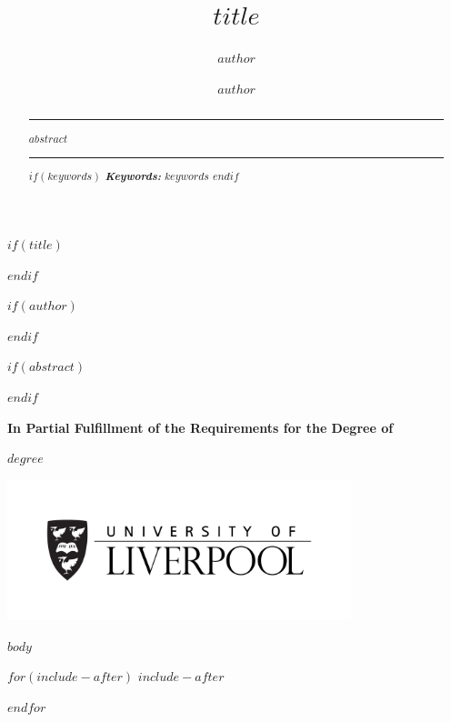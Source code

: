 \documentclass[a4paper, notitlepage]{extreport}
\title{$title$}
\author{$author$}
\renewcommand*{\tableofcontents}{\listoftoc[{\contentsname}]{toc}}%
\providecommand{\keywords}[1]{\footnotesize\textbf{\textit{Keywords:}} #1}
\newcommand{\copyrightfont}{\linespread{1}\normalfont\rmfamily\fontsize{7}{8}\selectfont}
\begin{document}

$if(title)$
    \maketitle
$endif$

$if(author)$
{\copyrightfont\author{$author$}}
$endif$

\date{}
    \thispagestyle{empty}
    \vskip 50pt
$if(abstract)$
  \begin{abstract}
      \centering\begin{minipage}{\dimexpr\paperwidth-10cm}
          \hrule
          \vskip 5pt
    $abstract$
    \vskip 5pt
    \hrule
    \vskip 10pt
$if(keywords)$
\keywords{$keywords$}
$endif$
\end{minipage}
  \end{abstract}
$endif$

\vskip 12pt

{\copyrightfont\centerline{\bfseries In Partial Fulfillment of the Requirements for the Degree of}}
{\copyrightfont\centerline{\bfseries $degree$}}
\centerline{\includegraphics[width = 100mm]{./template/uolLogo.png}}
\newpage

\tableofcontents

\listoffigures

\listoftables

\newpage


$body$

$for(include-after)$
$include-after$

$endfor$
\end{document}
